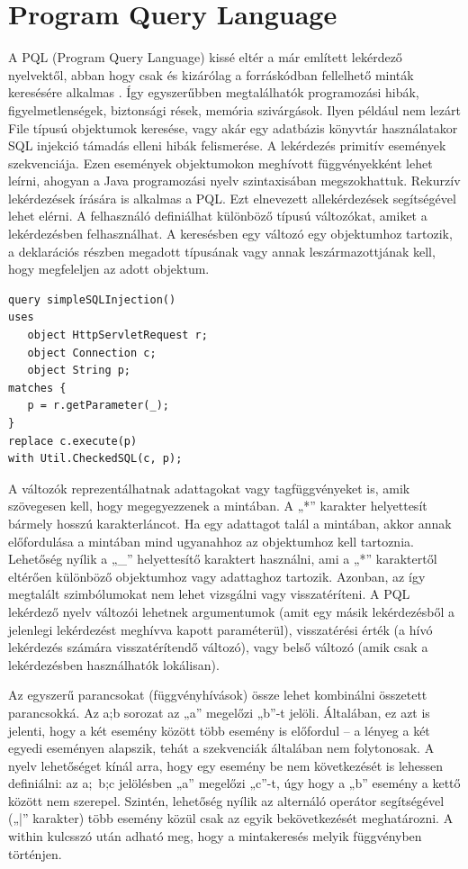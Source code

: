 \documentclass[a4paper,12pt]{report}
\begin{document}
\section{Program Query Language}
\par A PQL (Program Query Language) kissé eltér a már említett lekérdező nyelvektől, abban hogy csak és kizárólag a forráskódban fellelhető minták keresésére alkalmas \cite{pql}. Így egyszerűbben megtalálhatók programozási hibák, figyelmetlenségek, biztonsági rések, memória szivárgások. Ilyen például nem lezárt File típusú objektumok keresése, vagy akár egy adatbázis könyvtár használatakor SQL injekció támadás elleni hibák felismerése. A lekérdezés primitív események szekvenciája. Ezen események objektumokon meghívott függvényekként lehet leírni, ahogyan a Java programozási nyelv szintaxisában megszokhattuk. Rekurzív lekérdezések írására is alkalmas a PQL. Ezt elnevezett allekérdezések segítségével lehet elérni. A felhasználó definiálhat különböző típusú változókat, amiket a lekérdezésben felhasználhat. A keresésben egy változó egy objektumhoz tartozik, a deklarációs részben megadott típusának vagy annak leszármazottjának kell, hogy megfeleljen az adott objektum.
\begin{verbatim}
query simpleSQLInjection()
uses
   object HttpServletRequest r;
   object Connection c;
   object String p;
matches { 
   p = r.getParameter(_); 
}
replace c.execute(p)
with Util.CheckedSQL(c, p);
\end{verbatim} 
\par A változók reprezentálhatnak adattagokat vagy tagfüggvényeket is, amik szövegesen kell, hogy megegyezzenek a mintában. A „*” karakter helyettesít bármely hosszú karakterláncot. Ha egy adattagot talál a mintában, akkor annak előfordulása a mintában mind ugyanahhoz az objektumhoz kell tartoznia. Lehetőség nyílik a „\_” helyettesítő karaktert használni, ami a „*” karaktertől eltérően különböző objektumhoz vagy adattaghoz tartozik. Azonban, az így megtalált szimbólumokat nem lehet vizsgálni vagy visszatéríteni. A PQL lekérdező nyelv változói lehetnek argumentumok (amit egy másik lekérdezésből a jelenlegi lekérdezést meghívva kapott paraméterül), visszatérési érték (a hívó lekérdezés számára visszatérítendő változó), vagy belső változó (amik csak a lekérdezésben használhatók lokálisan).
\par Az egyszerű parancsokat (függvényhívások) össze lehet kombinálni összetett parancsokká. Az a;b sorozat az „a” megelőzi „b”-t jelöli. Általában, ez azt is jelenti, hogy a két esemény között több esemény is előfordul – a lényeg a két egyedi eseményen alapszik, tehát a szekvenciák általában nem folytonosak. A nyelv lehetőséget kínál arra, hogy egy esemény be nem következését is lehessen definiálni: az a;~b;c jelölésben „a” megelőzi „c”-t, úgy hogy a „b” esemény a kettő között nem szerepel. Szintén, lehetőség nyílik az alternáló operátor segítségével („|” karakter) több esemény közül csak az egyik bekövetkezését meghatározni. A within kulcsszó után adható meg, hogy a mintakeresés melyik függvényben történjen.
\end{document}
